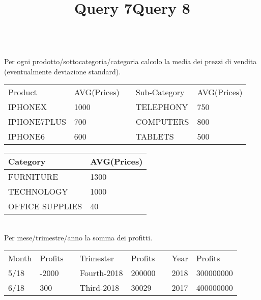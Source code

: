 \documentclass[11pt,a4paper]{article}
\begin{document}
\title{\textbf{Query 7}}\\
Per ogni prodotto/sottocategoria/categoria calcolo la media dei prezzi di vendita (eventualmente deviazione standard).
\begin{table}[h!]
	\begin{tabular}{|l|l|l|l|l|}
		\cline{1-2} \cline{4-5}
		Product     & AVG(Prices) &  & Sub-Category & AVG(Prices) \\ \cline{1-2} \cline{4-5} 
		IPHONEX     & 1000\EUR        &  & TELEPHONY    & 750\EUR         \\ \cline{1-2} \cline{4-5} 
		IPHONE7PLUS & 700\EUR         &  & COMPUTERS    & 800\EUR         \\ \cline{1-2} \cline{4-5} 
		IPHONE6     & 600\EUR         &  & TABLETS      & 500\EUR         \\ \cline{1-2} \cline{4-5} 
	\end{tabular}
\end{table}
\begin{table}[h!]
	\begin{tabular}{|l|l|}
		\hline
		Category        & AVG(Prices) \\ \hline
		FURNITURE       & 1300\EUR        \\ \hline
		TECHNOLOGY      & 1000\EUR        \\ \hline
		OFFICE SUPPLIES & 40\EUR          \\ \hline
	\end{tabular}
\end{table}

\title{\textbf{Query 8}}\\
Per mese/trimestre/anno la somma dei profitti.
\begin{table}[h!]
	\begin{tabular}{|l|l|l|l|l|l|l|l|}
		\cline{1-2} \cline{4-5} \cline{7-8}
		Month & Profits &  & Trimester   & Profits &  & Year & Profits   \\ \cline{1-2} \cline{4-5} \cline{7-8} 
		5/18  & -2000\EUR   &  & Fourth-2018 & 200000\EUR  &  & 2018 & 300000000\EUR \\ \cline{1-2} \cline{4-5} \cline{7-8} 
		6/18  & 300\EUR     &  & Third-2018  & 30029\EUR  &  & 2017 & 400000000\EUR \\ \cline{1-2} \cline{4-5} \cline{7-8} 
	\end{tabular}
\end{table}
\end{document}
